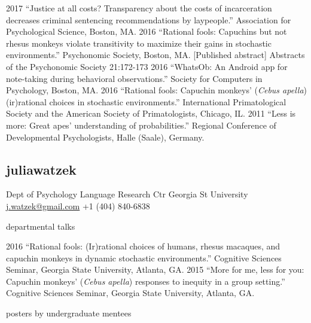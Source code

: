 \documentclass[]{friggeri-cv}
\begin{document}
\begin{entrylist2}
  \entrytwo
    {2017}
    {``Justice at all costs? Transparency about the costs of incarceration decreases criminal sentencing recommendations by laypeople.'' Association for Psychological Science, Boston, MA.}
\entrytwo
    {2016}
    {``Rational fools: Capuchins but not rhesus monkeys violate transitivity to maximize their gains in stochastic environments.'' Psychonomic Society, Boston, MA. [Published abstract] Abstracts of the Psychonomic Society 21:172-173}
  \entrytwo
    {2016}
    {``WhatsOb: An Android app for note-taking during behavioral observations.'' Society for Computers in Psychology, Boston, MA.}
  \entrytwo
    {2016}
    {``Rational fools: Capuchin monkeys' (\emph{Cebus apella}) (ir)rational choices in stochastic environments.'' International Primatological Society and the American Society of Primatologists, Chicago, IL.}
  \entrytwo
    {2011}
    {``Less is more: Great apes' understanding of probabilities.'' Regional Conference of Developmental Psychologists, Halle (Saale), Germany.}
\end{entrylist2}

\begin{aside}
  \section{{\normalfont julia}watzek}
    Dept of Psychology
    Language Research Ctr
    Georgia St University
    ~
    \href{mailto:j.watzek@gmail.com}{j.watzek@gmail.com}
    +1 (404) 840-6838
\end{aside}



{\subfont\large{} departmental talks}

\begin{entrylist2}
  \entrytwo
    {2016}
    {``Rational fools: (Ir)rational choices of humans, rhesus macaques, and capuchin monkeys in dynamic stochastic environments.'' Cognitive Sciences Seminar, Georgia State University, Atlanta, GA.}
  \entrytwo
    {2015}
    {``More for me, less for you: Capuchin monkeys' (\emph{Cebus apella}) responses to inequity in a group setting.'' Cognitive Sciences Seminar, Georgia State University, Atlanta, GA.}
\end{entrylist2}


{\subfont\large{} posters by undergraduate mentees}
\end{document}
